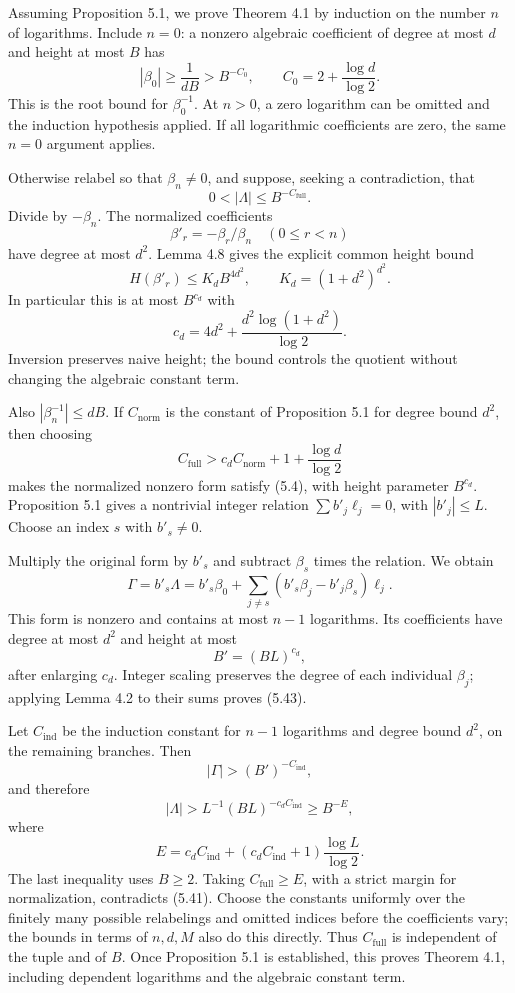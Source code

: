 \documentclass[
  11pt,
  a4paper,
]{article}
\begin{document}
Assuming Proposition 5.1, we prove Theorem 4.1 by induction on the
number \(n\) of logarithms. Include \(n=0\): a nonzero algebraic
coefficient of degree at most \(d\) and height at most \(B\) has \[
|\beta_0|\ge\frac1{dB}>B^{-C_0},\qquad
C_0=2+\frac{\log d}{\log2}.
\] This is the root bound for \(\beta_0^{-1}\). At \(n>0\), a zero
logarithm can be omitted and the induction hypothesis applied. If all
logarithmic coefficients are zero, the same \(n=0\) argument applies.

Otherwise relabel so that \(\beta_n\ne0\), and suppose, seeking a
contradiction, that \[
0<|\Lambda|\le B^{-C_{\mathrm{full}}}. \tag{5.41}
\] Divide by \(-\beta_n\). The normalized coefficients \[
\beta'_r=-\beta_r/\beta_n\quad(0\le r<n)
\] have degree at most \(d^2\). Lemma 4.8 gives the explicit common
height bound \[
H(\beta'_r)\le K_dB^{4d^2},\qquad K_d=(1+d^2)^{d^2}.
\] In particular this is at most \(B^{c_d}\) with \[
c_d=4d^2+\frac{d^2\log(1+d^2)}{\log2}.
\] Inversion preserves naive height; the bound controls the quotient
without changing the algebraic constant term.

Also \(|\beta_n^{-1}|\le dB\). If \(C_{\mathrm{norm}}\) is the constant
of Proposition 5.1 for degree bound \(d^2\), then choosing \[
C_{\mathrm{full}}>c_d C_{\mathrm{norm}}+1+\frac{\log d}{\log2}
\] makes the normalized nonzero form satisfy (5.4), with height
parameter \(B^{c_d}\). Proposition 5.1 gives a nontrivial integer
relation \(\sum b'_j\ell_j=0\), with \(|b'_j|\le L\). Choose an index
\(s\) with \(b'_s\ne0\).

Multiply the original form by \(b'_s\) and subtract \(\beta_s\) times
the relation. We obtain \[
\Gamma=b'_s\Lambda
=b'_s\beta_0+\sum_{j\ne s}(b'_s\beta_j-b'_j\beta_s)\ell_j. \tag{5.42}
\] This form is nonzero and contains at most \(n-1\) logarithms. Its
coefficients have degree at most \(d^2\) and height at most \[
B'=(BL)^{c_d}, \tag{5.43}
\] after enlarging \(c_d\). Integer scaling preserves the degree of each
individual \(\beta_j\); applying Lemma 4.2 to their sums proves (5.43).

Let \(C_{\mathrm{ind}}\) be the induction constant for \(n-1\)
logarithms and degree bound \(d^2\), on the remaining branches. Then \[
|\Gamma|>(B')^{-C_{\mathrm{ind}}},
\] and therefore \[
|\Lambda|>L^{-1}(BL)^{-c_d C_{\mathrm{ind}}}
\ge B^{-E}, \tag{5.44}
\] where \[
E=c_dC_{\mathrm{ind}}
+(c_dC_{\mathrm{ind}}+1)\frac{\log L}{\log2}.
\] The last inequality uses \(B\ge2\). Taking
\(C_{\mathrm{full}}\ge E\), with a strict margin for normalization,
contradicts (5.41). Choose the constants uniformly over the finitely
many possible relabelings and omitted indices before the coefficients
vary; the bounds in terms of \(n,d,M\) also do this directly. Thus
\(C_{\mathrm{full}}\) is independent of the tuple and of \(B\). Once
Proposition 5.1 is established, this proves Theorem 4.1, including
dependent logarithms and the algebraic constant term.
\end{document}
